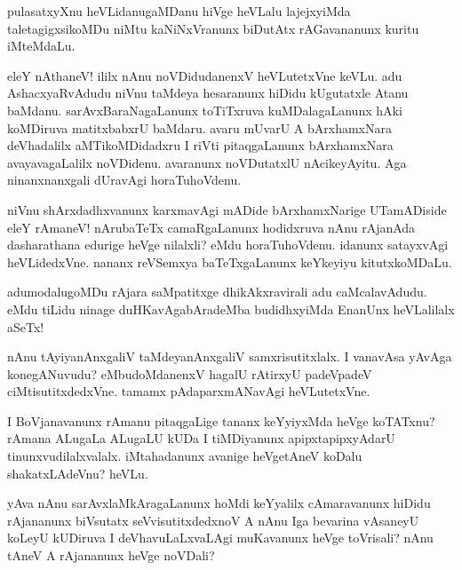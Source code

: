 \begin{mng}
pulasatxyXnu heVLidanu\mdash gaMDanu hiVge heVLalu lajejxyiMda taletagigxsikoMDu niMtu kaNiNxVranunx biDutAtx rAGavananunx kuritu iMteMdaLu.
\end{mng}

\begin{mng}
eleY nAthaneV! ililx nAnu noVDidudanenxV heVLutetxVne keVLu. adu AshacxyaRvAdudu niVnu taMdeya hesaranunx hiDidu kUgutatxle Atanu baMdanu. sarAvxBaraNagaLanunx toTiTxruva kuMDalagaLanunx hAki koMDiruva matitxbabxrU baMdaru. avaru mUvarU A bArxhamxNara deVhadalilx aMTikoMDidadxru I riVti pitaqgaLanunx bArxhamxNara avayavagaLalilx noVDidenu. avaranunx noVDutatxlU nAcikeyAyitu. Aga ninanxnanxgali dUravAgi horaTuhoVdenu.
\end{mng}

\begin{mng}
niVnu shArxdadhxvanunx karxmavAgi mADide bArxhamxNarige UTamADiside eleY rAmaneV! nArubaTeTx camaRgaLanunx hodidxruva nAnu rAjanAda dasharathana edurige heVge nilalxli? eMdu horaTuhoVdenu. idanunx satayxvAgi heVLidedxVne. nananx reVSemxya baTeTxgaLanunx keYkeyiyu kitutxkoMDaLu.
\end{mng}

\begin{mng}
adumodalugoMDu rAjara saMpatitxge dhikAkxravirali adu caMcalavAdudu. eMdu tiLidu ninage duHKavAgabAradeMba budidhxyiMda EnanUnx heVLalilalx aSeTx!
\end{mng}

\begin{mng}
nAnu tAyiyanAnxgaliV taMdeyanAnxgaliV samxrisutitxlalx. I vanavAsa yAvAga konegANuvudu? eMbudoMdanenxV hagalU rAtirxyU padeVpadeV ciMtisutitxdedxVne. tamamx pAdaparxmANavAgi heVLutetxVne.
\end{mng}

\begin{mng}
I BoVjanavanunx rAmanu pitaqgaLige tananx keYyiyxMda heVge koTATxnu? rAmana ALugaLa ALugaLU kUDa I tiMDiyanunx apipxtapipxyAdarU tinunxvudilalxvalalx. iMtahadanunx avanige heVgetAneV koDalu shakatxLAdeVnu? heVLu.
\end{mng}

\begin{mng}
yAva nAnu sarAvxlaMkAragaLanunx hoMdi keYyalilx cAmaravanunx hiDidu rAjananunx biVsutatx seVvisutitxdedxnoV A nAnu Iga bevarina vAsaneyU koLeyU kUDiruva I deVhavuLaLxvaLAgi muKavanunx heVge toVrisali? nAnu tAneV A rAjananunx heVge noVDali?
\end{mng}

